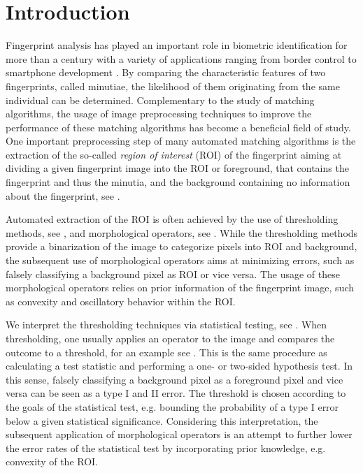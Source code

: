\documentclass[a4paper,12pt]{article}
\theoremstyle{plain}
\theoremstyle{definition}
\numberwithin{equation}{section}
\begin{document}
\newpage



\section{Introduction}\label{section: introduction}

Fingerprint analysis has played an important role in biometric identification for more than a century with a variety of applications ranging from border control to smartphone development \cite{Henry}. By comparing the characteristic features of two fingerprints, called minutiae, the likelihood of them originating from the same individual can be determined. Complementary to the study of matching algorithms, the usage of image preprocessing techniques to improve the performance of these matching algorithms has become a beneficial field of study. One important preprocessing step of many automated matching algorithms is the extraction of the so-called \emph{region of interest} (ROI) of the fingerprint aiming at dividing a given fingerprint image into the ROI or foreground, that contains the fingerprint and thus the minutia, and the background containing no information about the fingerprint, see \cite{handbookfipri}.

Automated extraction of the ROI is often achieved by the use of thresholding methods, see \cite{Kittler1986, FDB}, and morphological operators, see \cite{FDB, BazenGerez, adaboost}. While the thresholding methods provide a binarization of the image to categorize pixels into ROI and background, the subsequent use of morphological operators aims at minimizing errors, such as falsely classifying a background pixel as ROI or vice versa. The usage of these morphological operators relies on prior information of the fingerprint image, such as convexity and oscillatory behavior within the ROI.

We interpret the thresholding techniques via statistical testing, see \cite{XueTitterington, DonohoJohnstone1995}. When thresholding, one usually applies an operator to the image and compares the outcome to a threshold, for an example see \cite{AbramovichBenjamini1996}. This is the same procedure as calculating a test statistic and performing a one- or two-sided hypothesis test. In this sense, falsely classifying a background pixel as a foreground pixel and vice versa can be seen as a type I and II error. The threshold is chosen according to the goals of the statistical test, e.g. bounding the probability of a type I error below a given statistical significance. Considering this interpretation, the subsequent application of morphological operators is an attempt to further lower the error rates of the statistical test by incorporating prior knowledge, e.g. convexity of the ROI.
\end{document}
